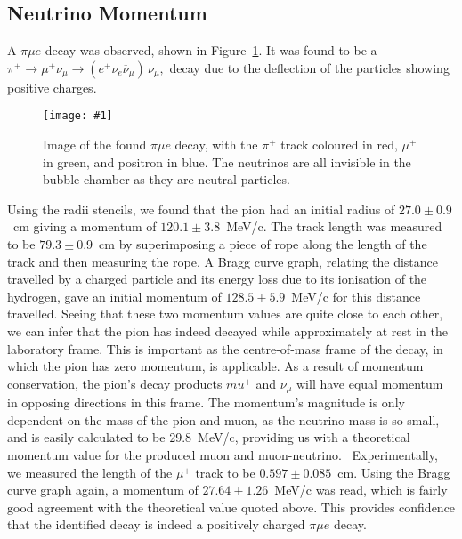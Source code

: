 \documentclass[twocolumn]{article}
\newcommand{\insertFigure}[1]{%
   \texttt{[image: \#1]}%
}
\begin{document}
\subsection{Neutrino Momentum}
A $\pi \mu e$ decay was observed, shown in Figure~\ref{fig:neutrino}. It was found to be a $\pi^+ \to \mu^+ \nu_\mu \to (e^+ \nu_e \overline{\nu}_{\mu}) \, \nu_\mu,$ decay due to the deflection of the particles showing positive charges.
\begin{figure}[!h]
	\centering
	\insertFigure{neutrino.png}
	\caption{Image of the found $\pi \mu e$ decay, with the $\pi^+$ track coloured in red, $\mu^+$ in green, and positron in blue. The neutrinos are all invisible in the bubble chamber as they are neutral particles.}
	\label{fig:neutrino}
\end{figure}
Using the radii stencils, we found that the pion had an initial radius of $27.0 \pm 0.9$~cm giving a momentum of $120.1 \pm 3.8$~MeV/c. The track length was measured to be $79.3 \pm 0.9$~cm by superimposing a piece of rope along the length of the track and then measuring the rope. A Bragg curve graph, relating the distance travelled by a charged particle and its energy loss due to its ionisation of the hydrogen, gave an initial momentum of $128.5 \pm 5.9$~MeV/c for this distance travelled. Seeing that these two momentum values are quite close to each other, we can infer that the pion has indeed decayed while approximately at rest in the laboratory frame. This is important as the centre-of-mass frame of the decay, in which the pion has zero momentum, is applicable. As a result of momentum conservation, the pion's decay products $mu^+$ and $\nu_\mu$ will have equal momentum in opposing directions in this frame. The momentum's magnitude is only dependent on the mass of the pion and muon, as the neutrino mass is so small, and is easily calculated to be $29.8$~MeV/c, providing us with a theoretical momentum value for the produced muon and muon-neutrino.~\cite{seul} Experimentally, we measured the length of the $\mu^+$ track to be $0.597 \pm 0.085$~cm. Using the Bragg curve graph again, a momentum of $27.64 \pm 1.26$~MeV/c was read, which is fairly good agreement with the theoretical value quoted above. This provides confidence that the identified decay is indeed a positively charged $\pi \mu e$ decay.
\end{document}
